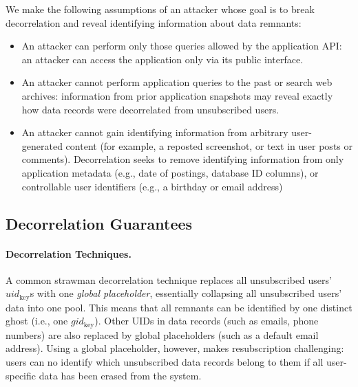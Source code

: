 We make the following assumptions of an attacker whose goal is to break decorrelation and reveal
identifying information about data remnants:

\begin{itemize}
    \item An attacker can perform only those queries allowed by the application API: an
attacker can access the application only via its public interface. 

\item An attacker cannot perform application queries to the past or search web archives:
information from prior application snapshots may reveal 
exactly how data records were decorrelated from unsubscribed users. 

\item An attacker cannot gain identifying information from arbitrary user-generated content (for
    example, a reposted screenshot, or text in user posts or comments).  Decorrelation seeks to
        remove identifying information from only application metadata (e.g., date of postings,
        database ID columns), or controllable user identifiers (e.g., a birthday or email address)
\end{itemize}

\subsection{Decorrelation Guarantees} 
\paragraph{Decorrelation Techniques.}
A common strawman decorrelation technique replaces all unsubscribed users' $uid_\text{key}$s with
one \emph{global placeholder}, essentially collapsing all unsubscribed users' data into one pool.
This means that all remnants can be identified by one distinct ghost (i.e., one $gid_\text{key}$). 
Other UIDs in data records (such as emails, phone numbers) are also replaced by global
placeholders (such as a default email address).
Using a global placeholder, however, makes resubscription challenging: users can no identify which unsubscribed data records belong to them if all user-specific data has been erased from the
system. 

